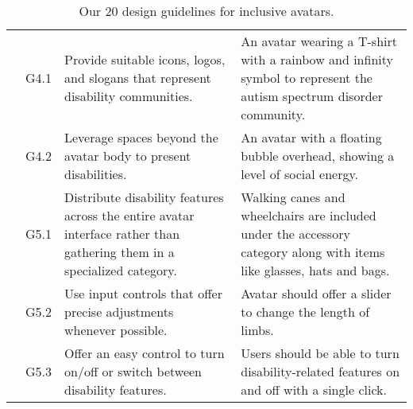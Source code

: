 \begin{table*}[!t]
\begin{tabular}{|p{0.5cm}|p{0.4cm}|p{6.8cm}|p{8.5cm}|}
\multirow{2}{*}{\rotatebox[origin=c]{90}{\parbox{1.4cm}{\centering \textbf{G4. Peri-}\\\textbf{pherals}}}} 
& G4.1
& Provide suitable icons, logos, and slogans that represent disability communities.
& An avatar wearing a T-shirt with a rainbow and infinity symbol to represent the autism spectrum disorder community. \\ \cline{2-4}

& G4.2
& Leverage spaces beyond the avatar body to present disabilities.
& An avatar with a floating bubble overhead, showing a level of social energy. \\
\hline

\multirow{3}{*}{\rotatebox[origin=c]{90}{\parbox{2.5cm}{\centering \textbf{G5. Interface}}}} 
& G5.1
& Distribute disability features across the entire avatar interface rather than gathering them in a specialized category.
& Walking canes and wheelchairs are included under the accessory category along with items like glasses, hats and bags. \\ \cline{2-4}

& G5.2
& Use input controls that offer precise adjustments whenever possible.
& Avatar should offer a slider to change the length of limbs. \\ \cline{2-4}

& G5.3
& Offer an easy control to turn on/off or switch between disability features.
& Users should be able to turn disability-related features on and off with a single click. \\
\hline

\end{tabular}
\caption{Our  20 design guidelines for inclusive avatars. }
\label{tab:overview_original}
\end{table*}